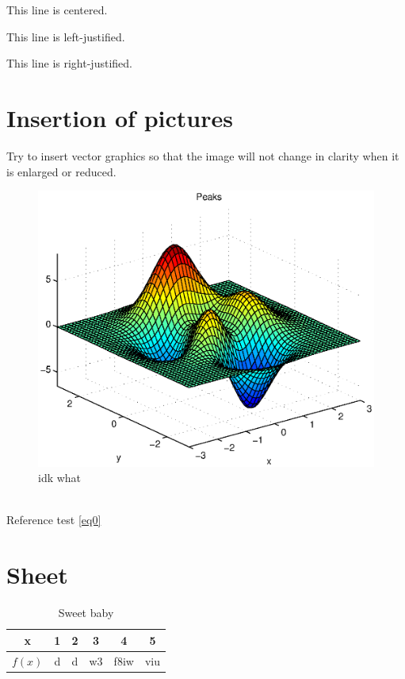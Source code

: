 \documentclass[12pt, a4paper]{article}
\begin{document}
\vspace{1cm}

\begin{center}
    This line is centered.
\end{center}

\begin{flushleft}
    This line is left-justified.
\end{flushleft}

\begin{flushright}
    This line is right-justified.
\end{flushright}

\section{Insertion of pictures}
Try to insert vector graphics\cite{mckay2002role} so that the image will not change in clarity when it is enlarged or reduced.
\begin{figure}[htbp]
    \includegraphics[width=12cm]{mcmthesis-aaa.eps}
    \caption{idk what}
    \label{fig:a}    
\end{figure}
\\Reference test \autoref{eq0}

\newpage
\section{Sheet}
\begin{table}[h]
    \centering
    \def\arraystretch{1.2}
    \begin{tabular}{|c|||ccccc|}
    \hline
    x & 1 & 2 & 3 & 4 & 5 \\ \hline
    $f(x)$ & d & d & w3 & f8iw & viu \\ \hline
    \end{tabular}
    \caption{Sweet baby}
\end{table}
\end{document}

